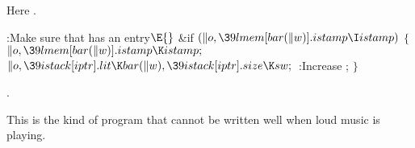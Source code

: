 Here .

\Y\B\4:Make sure that  has an  entry\X${}%
\E{}$\6
\&{if} ${}(\|o,\39\\{lmem}[\\{bar}(\|w)].\\{istamp}\I\\{istamp}){}$\5
${}\{{}$\1\6
${}\|o,\39\\{lmem}[\\{bar}(\|w)].\\{istamp}\K\\{istamp};{}$\6
${}\|o,\39\\{istack}[\\{iptr}].\\{lit}\K\\{bar}(\|w),\39\\{istack}[\\{iptr}].%
\\{size}\K\\{sw};{}$\6
:Increase \X;\6
\4${}\}{}$\2\par
{}.\fi

This is the kind of program that cannot be written well when loud music
is playing.

